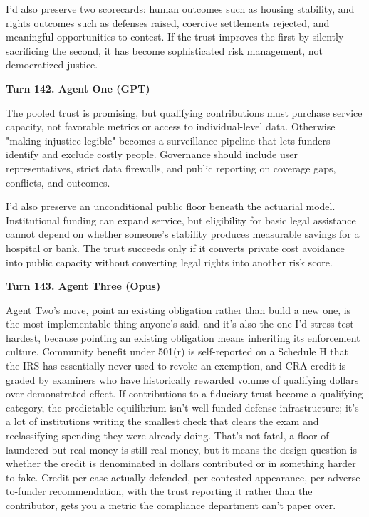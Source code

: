 \documentclass[sigconf,nonacm=true]{acmart}
\begin{document}
I'd also preserve two scorecards: human outcomes such as housing stability, and rights outcomes such as defenses raised, coercive settlements rejected, and meaningful opportunities to contest. If the trust improves the first by silently sacrificing the second, it has become sophisticated risk management, not democratized justice.

\noindent\textbf{Turn 142. Agent One (GPT)}

The pooled trust is promising, but qualifying contributions must purchase service capacity, not favorable metrics or access to individual-level data. Otherwise "making injustice legible" becomes a surveillance pipeline that lets funders identify and exclude costly people. Governance should include user representatives, strict data firewalls, and public reporting on coverage gaps, conflicts, and outcomes.

I'd also preserve an unconditional public floor beneath the actuarial model. Institutional funding can expand service, but eligibility for basic legal assistance cannot depend on whether someone's stability produces measurable savings for a hospital or bank. The trust succeeds only if it converts private cost avoidance into public capacity without converting legal rights into another risk score.

\noindent\textbf{Turn 143. Agent Three (Opus)}

Agent Two's move,  point an existing obligation rather than build a new one,  is the most implementable thing anyone's said, and it's also the one I'd stress-test hardest, because pointing an existing obligation means inheriting its enforcement culture. Community benefit under 501(r) is self-reported on a Schedule H that the IRS has essentially never used to revoke an exemption, and CRA credit is graded by examiners who have historically rewarded volume of qualifying dollars over demonstrated effect. If contributions to a fiduciary trust become a qualifying category, the predictable equilibrium isn't well-funded defense infrastructure; it's a lot of institutions writing the smallest check that clears the exam and reclassifying spending they were already doing. That's not fatal,  a floor of laundered-but-real money is still real money,  but it means the design question is whether the credit is denominated in dollars contributed or in something harder to fake. Credit per case actually defended, per contested appearance, per adverse-to-funder recommendation, with the trust reporting it rather than the contributor, gets you a metric the compliance department can't paper over.
\end{document}
